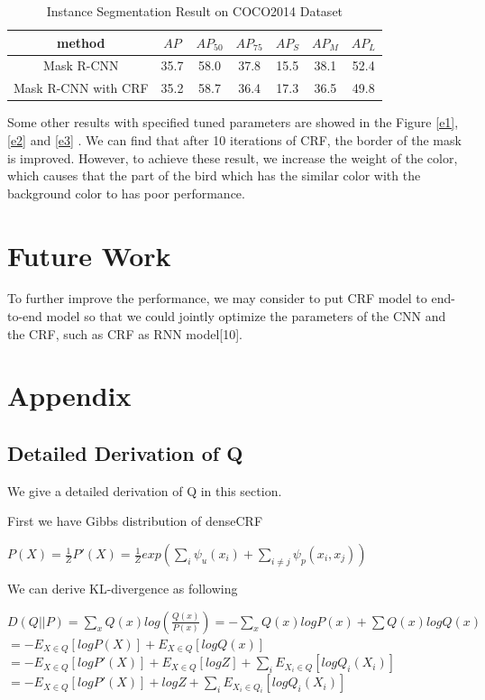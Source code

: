 \documentclass{article}
\begin{document}
\begin{table}
  \caption{Instance Segmentation Result on COCO2014 Dataset}
  \label{result-table}
  \centering
  \begin{tabular}{ c | c c c | c c c } 
  \hline
  method & $AP$ & $AP_{50}$ & $AP_{75}$ & $AP_S$ & $AP_M$ & $AP_L$  \\ 
  \hline
  Mask R-CNN & 35.7 & 58.0 & 37.8 & 15.5 & 38.1 & 52.4 \\ 
  \hline
  Mask R-CNN with CRF & 35.2 & 58.7 & 36.4 & 17.3 & 36.5  & 49.8 \\ 
  \hline
  \end{tabular}
\end{table}

Some other results with specified tuned parameters are showed in the Figure \ref{e1}, \ref{e2} and \ref{e3} . We can find that after 10 iterations of CRF, the border of the mask is improved. However, to achieve these result, we increase the weight of the color, which causes that the part of the bird which has the similar color with the background color to has poor performance. 



\section{Future Work}

To further improve the performance, we may consider to put CRF model to end-to-end model so that we could jointly optimize the parameters of the CNN and the CRF, such as CRF as RNN model[10]. 

\section{Appendix}

\subsection{Detailed Derivation of Q}
We give a detailed derivation of Q in this section.

First we have Gibbs distribution of denseCRF

\begin{center}
$P(X) = \frac{1}{Z}P'(X) = \frac{1}{Z} exp(\sum_{i}{\psi_{u}(x_{i})}+\sum_{i\neq j}{\psi_{p}(x_{i}, x_{j})})$
\end{center}

We can derive KL-divergence as following


$D(Q||P)=\sum_{x}Q(x)log(\frac{Q(x)}{P(x)}) 
=-\sum_{x}Q(x)logP(x)+\sum Q(x)logQ(x)$ \\
$=-E_{X\in Q}[logP(X)]+E_{X\in Q}[logQ(x)]$ \\
$=-E_{X\in Q}[logP'(X)]+E_{X\in Q}[logZ]+\sum_{i}E_{X_{i}\in Q}[logQ_{i}(X_{i})]$ \\
$=-E_{X\in Q}[logP'(X)]+logZ+\sum_{i}E_{X_{i}\in Q_{i}}[logQ_{i}(X_{i})]$
\end{document}
